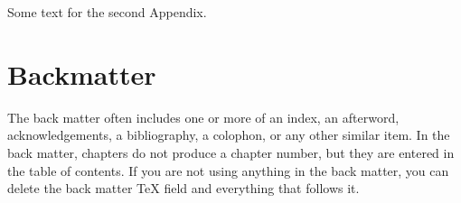 \documentclass{book}%
\begin{document}
Some text for the second Appendix.

\backmatter

\part{Backmatter}

The back matter often includes one or more of an index, an afterword,
acknowledgements, a bibliography, a colophon, or any other similar item. In
the back matter, chapters do not produce a chapter number, but they are
entered in the table of contents. If you are not using anything in the back
matter, you can delete the back matter TeX field and everything that follows it.

\renewcommand\bibname{References}
\setlength{\bibsep}{2\baselineskip}
\setlength\bibindent{.5in}


\printglossary
\end{document}
